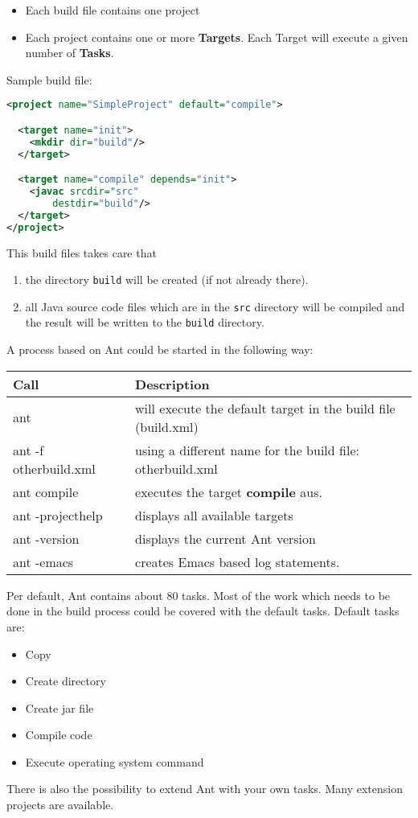 \begin{itemize}
\item Each build file contains one project
\item Each project contains one or more {\bfseries Targets}. Each Target
will execute a given number of {\bfseries Tasks}.
\end{itemize}
\newslide
Sample build file:
\begin{lstlisting}[language=xml,morekeywords={project,target,javac,mkdir}]
<project name="SimpleProject" default="compile">

  <target name="init">
    <mkdir dir="build"/>
  </target>

  <target name="compile" depends="init">
    <javac srcdir="src"
        destdir="build"/>
  </target>
</project>
\end{lstlisting}
\ifslides
\else
This build files takes care that
\begin{enumerate}
\item the directory \verb|build| will be created (if not already there).
\item all Java source code files which are in the \verb|src| directory
  will be compiled and the result will be written to the \verb|build| directory.
\end{enumerate}
\fi
\newslide
A process based on Ant could be started in the following way:

\begin{tabularx}{\linewidth}{l|X}
Call   & Description \\
\hline
ant  &  will execute the default target in the build file (build.xml)\\
ant -f otherbuild.xml & using a different name for the build file: otherbuild.xml\\
ant compile & executes the target {\bfseries compile}
  aus.\\
ant -projecthelp & displays all available targets\\
ant -version & displays the current Ant version\\
ant -emacs & creates Emacs based log statements.\\
\end{tabularx}

Per default, Ant contains about 80 tasks. Most of the work which
needs to be done in the build process could be covered with the
default tasks. Default tasks are:
\begin{itemize}
\item Copy
\item Create directory
\item Create jar file
\item Compile code
\item Execute operating system command
\end{itemize}
There is also the possibility to extend Ant with your own tasks.
Many extension projects are available.

